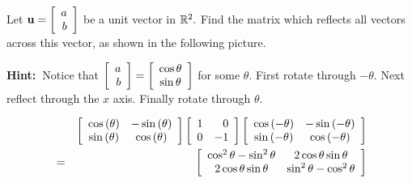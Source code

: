\begin{enumialphparenastyle}
\begin{ex} Let ${\bf u}=\left[ 
\begin{array}{r}
a \\
b
\end{array}
\right] $ be a unit vector in $\mathbb{R}^{2}.$ Find the matrix
 which reflects all vectors across
this vector, as shown in the following picture. 

\begin{center}
\end{center}


\textbf{Hint:\ }Notice that $\left[ 
\begin{array}{r}
a \\
b
\end{array}
\right] =\left[
\begin{array}{c}
\cos \theta  \\
\sin \theta 
\end{array}
\right] $ for some $\theta .$ First rotate through $-\theta .$ Next reflect through the $x$ axis. Finally rotate
through $\theta $. 
\begin{sol}
\begin{eqnarray*}
&&\leftB
\begin{array}{cc}
\cos \left( \theta \right) & -\sin \left( \theta \right) \\
\sin \left( \theta \right) & \cos \left( \theta \right)
\end{array}
\rightB \leftB
\begin{array}{rr}
1 & 0 \\
0 & -1
\end{array}
\rightB \leftB
\begin{array}{cc}
\cos \left( -\theta \right) & -\sin \left( -\theta \right) \\
\sin \left( -\theta \right) & \cos \left( -\theta \right)
\end{array}
\rightB \\
&=& \leftB
\begin{array}{cc}
\cos ^{2}\theta -\sin ^{2}\theta & 2\cos \theta \sin \theta \\
2\cos \theta \sin \theta & \sin ^{2}\theta -\cos ^{2}\theta%
\end{array}
\rightB
\end{eqnarray*}

\end{sol}
\end{ex}
\end{enumialphparenastyle}
